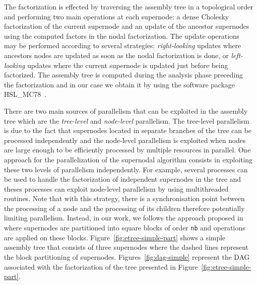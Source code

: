 \documentclass{article}
\begin{document}
The factorization is effected by traversing the assembly tree in a
topological order and performing two main operations at each
supernode: a dense Cholesky factorization of the current supernode and
an update of the ancestor supernodes using the computed factors in the
nodal factorization. The update operations may be performed according
to several strategies: \textit{right-looking} updates where ancestors
nodes are updated as soon as the nodal factorization is done, or
\textit{left-looking} updates where the current supernode is updated
just before being factorized. The assembly tree is computed during the
analysis phase preceding the factorization and in our case we obtain
it by using the software package HSL\_MC78~\cite{h.s:10}.

There are two main sources of parallelism that can be exploited in the
assembly tree which are the \textit{tree-level} and
\textit{node-level} parallelism. The tree-level parallelism is due to
the fact that supernodes located in separate branches of the tree can
be processed independently and the node-level parallelism is exploited
when nodes are large enough to be efficiently processed by multiple
resources in parallel. One approach for the parallelization of the
supernodal algorithm consists in exploiting these two levels of
parallelism independently. For example, several processes can be used
to handle the factorization of independent supernodes in the tree and
theses processes can exploit node-level parallelism by using
multithreaded routines. Note that with this strategy, there is a
synchronisation point between the processing of a node and the
processing of its children therefore potentially limiting
parallelism. Instead, in our work, we follows the approach proposed
in~\cite{h.r.s:10} where supernodes are partitioned into square blocks
of order \texttt{nb} and operations are applied on these
blocks. Figure~\ref{fig:etree-simple-part} shows a simple assembly
tree that consists of three supernodes where the dashed lines
represent the block partitioning of
supernodes. Figures~\ref{fig:dag-simple} represent the DAG associated
with the factorization of the tree presented in
Figure~\ref{fig:etree-simple-part}.
\end{document}

